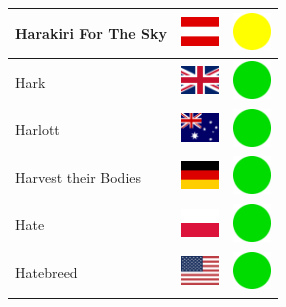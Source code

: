 \documentclass[12pt, a4paper, twoside]{report}
\begin{document}
\begin{center}
\begin{longtable}{|p{5cm}|p{2cm}|p{2cm}|}
 Harakiri For The Sky                                       & \includegraphics[width=1cm]{../4x3/at} &   \includegraphics[width=1cm]{../likes/m} \\ \hline
 Hark                                                       & \includegraphics[width=1cm]{../4x3/gb} &   \includegraphics[width=1cm]{../likes/y} \\ \hline
 Harlott                                                    & \includegraphics[width=1cm]{../4x3/au} &   \includegraphics[width=1cm]{../likes/y} \\ \hline
 Harvest their Bodies                                       & \includegraphics[width=1cm]{../4x3/de} &   \includegraphics[width=1cm]{../likes/y} \\ \hline
 Hate                                                       & \includegraphics[width=1cm]{../4x3/pl} &   \includegraphics[width=1cm]{../likes/y} \\ \hline
 Hatebreed                                                  & \includegraphics[width=1cm]{../4x3/us} &   \includegraphics[width=1cm]{../likes/y} \\ \hline

\end{longtable}
\end{center}
\end{document}
